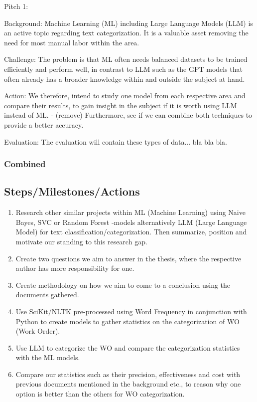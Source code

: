 \documentclass{article}
\begin{document}
Pitch 1:

Background:
Machine Learning (ML) including Large Language Models (LLM) is an active topic regarding text
categorization. It is a valuable asset removing the need for most manual labor within the area.

Challenge:
The problem is that ML often needs balanced datasets to be trained efficiently and perform well,
in contrast to LLM such as the GPT models that often already has a broader knowledge within and
outside the subject at hand.

Action:
We therefore, intend to study one model from each respective area and compare their results,
to gain insight in the subject if it is worth using LLM instead of ML.
- (remove) Furthermore, see if we can combine both techniques to provide a better accuracy.

Evaluation:
The evaluation will contain these types of data... bla bla bla.

\subsubsection{Combined}



\subsection{Steps/Milestones/Actions}

\begin{enumerate}
      \item Research other similar projects within ML (Machine Learning) using Naive Bayes,
            SVC or Random Forest -models alternatively LLM (Large Language Model) for text
            classification/categorization. Then summarize, position and motivate our standing to
            this research gap.
      \item Create two questions we aim to answer in the thesis, where the respective author
            has more responsibility for one.
      \item Create methodology on how we aim to come to a conclusion using the documents gathered.
      \item Use SciKit/NLTK pre-processed using Word Frequency in conjunction with Python
            to create models to gather statistics on the categorization of WO (Work Order).
      \item Use LLM to categorize the WO and compare the categorization statistics
            with the ML models.
      \item Compare our statistics such as their precision,
            effectiveness and cost with previous documents mentioned in the background etc.,
            to reason why one option is better than the others for WO categorization.
\end{enumerate}
\end{document}
